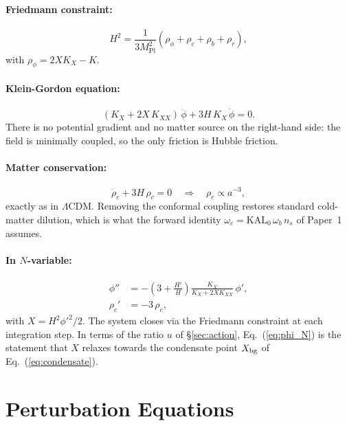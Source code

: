 \documentclass[12pt,a4paper]{article}
\newcommand{\KAL}{\mathrm{KAL}_0}
\newcommand{\Mpl}{M_{\mathrm{Pl}}}
\newcommand{\brac}[1]{\left(#1\right)}
\begin{document}
\paragraph{Friedmann constraint:}
\begin{equation}
  H^2 = \frac{1}{3\Mpl^2}
        \brac{\rho_\phi + \rho_{c} + \rho_b + \rho_r},
  \label{eq:Friedmann}
\end{equation}
with $\rho_\phi = 2XK_X - K$.

\paragraph{Klein-Gordon equation:}
\begin{equation}
  \brac{K_X + 2X\,K_{XX}}\,\ddot\phi
  + 3H\,K_X\,\dot\phi
  = 0.
  \label{eq:KG}
\end{equation}
There is no potential gradient and no matter source on the right-hand
side: the field is minimally coupled, so the only friction is Hubble
friction.

\paragraph{Matter conservation:}
\begin{equation}
  \dot\rho_{c} + 3H\,\rho_{c} = 0
  \quad\Longrightarrow\quad
  \rho_{c} \propto a^{-3},
  \label{eq:rhoc}
\end{equation}
exactly as in $\Lambda$CDM.  Removing the conformal coupling restores
standard cold-matter dilution, which is what the forward identity
$\omega_c = \KAL\,\omega_b\,n_s$ of Paper~1 assumes.

\paragraph{In $N$-variable:}
\begin{align}
  \phi''  &= -\brac{3 + \frac{H'}{H}}
             \frac{K_X}{K_X + 2XK_{XX}}\,\phi',
  \label{eq:phi_N}\\[4pt]
  \rho_{c}' &= -3\,\rho_{c},
  \label{eq:rho_N}
\end{align}
with $X = H^2{\phi'}^2/2$.  The system closes via the Friedmann
constraint at each integration step.  In terms of the ratio $u$ of
§\ref{sec:action}, Eq.~(\ref{eq:phi_N}) is the statement that
$X$ relaxes towards the condensate point $X_{\rm bg}$ of
Eq.~(\ref{eq:condensate}).
\section{Perturbation Equations}
\label{sec:perturbations}
\end{document}
